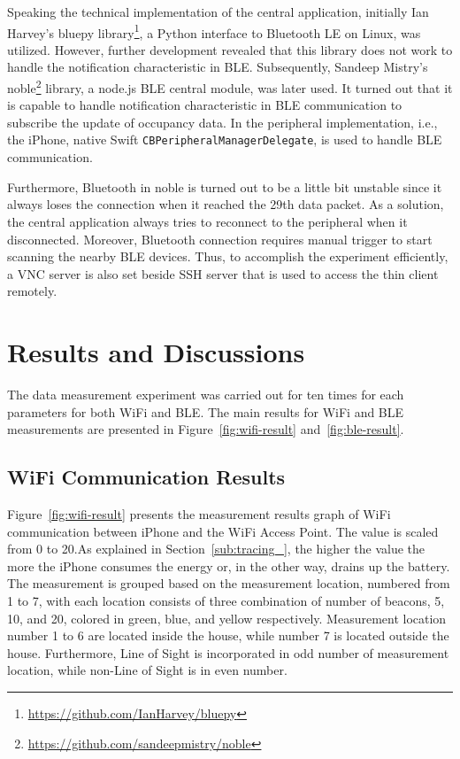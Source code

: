 \documentclass[journal]{vgtc}                %
\begin{document}

Speaking the technical implementation of the central application, initially Ian Harvey's bluepy library\footnote{\url{https://github.com/IanHarvey/bluepy}}, a Python interface to Bluetooth LE on Linux, was utilized. However, further development revealed that this library does not work to handle the notification characteristic in BLE. Subsequently, Sandeep Mistry's noble\footnote{\url{https://github.com/sandeepmistry/noble}} library, a node.js BLE central module, was later used. It turned out that it is capable to handle notification characteristic in BLE communication to subscribe the update of occupancy data. In the peripheral implementation, i.e., the iPhone, native Swift \verb|CBPeripheralManagerDelegate|, is used to handle BLE communication.

Furthermore, Bluetooth in noble is turned out to be a little bit unstable since it always loses the connection when it reached the 29th data packet. As a solution, the central application always tries to reconnect to the peripheral when it disconnected. Moreover, Bluetooth connection requires manual trigger to start scanning the nearby BLE devices. Thus, to accomplish the experiment efficiently, a VNC server is also set beside SSH server that is used to access the thin client remotely.

\section{Results and Discussions} %
\label{sec:results_and_discussion}
The data measurement experiment was carried out for ten times for each parameters for both WiFi and BLE. The main results for WiFi and BLE measurements are presented in Figure~\ref{fig:wifi-result} and~\ref{fig:ble-result}.

\subsection{WiFi Communication Results} %
\label{sub:wifi_communication_results}
Figure~\ref{fig:wifi-result} presents the measurement results graph of WiFi communication between iPhone and the WiFi Access Point. The value is scaled from 0 to 20.As explained in Section~\ref{sub:tracing_}, the higher the value the more the iPhone consumes the energy or, in the other way, drains up the battery. The measurement is grouped based on the measurement location, numbered from 1 to 7, with each location consists of three combination of number of beacons, 5, 10, and 20, colored in green, blue, and yellow respectively. Measurement location number 1 to 6 are located inside the house, while number 7 is located outside the house. Furthermore, Line of Sight is incorporated in odd number of measurement location, while non-Line of Sight is in even number.
\end{document}
